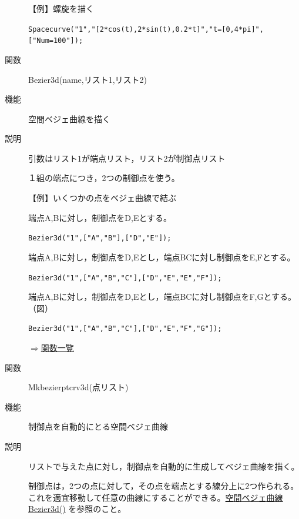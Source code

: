 \documentclass[papersize,a4paper,12pt,uplatex]{jsarticle}
\begin{document}
\begin{description}
\vspace{\baselineskip}
【例】螺旋を描く

\verb|Spacecurve("1","[2*cos(t),2*sin(t),0.2*t]","t=[0,4*pi]",["Num=100"]);|

\vspace{\baselineskip}
 \begin{center}  \end{center}


\hypertarget{bezier3d}{}
\item[関数]Bezier3d(name,リスト1,リスト2)
\item[機能]空間ベジェ曲線を描く
\item[説明]引数はリスト1が端点リスト，リスト2が制御点リスト

１組の端点につき，2つの制御点を使う。

\vspace{\baselineskip}
【例】いくつかの点をベジェ曲線で結ぶ

端点A,Bに対し，制御点をD,Eとする。

\verb|Bezier3d("1",["A","B"],["D","E"]);| \vspace{\baselineskip}

端点A,Bに対し，制御点をD,Eとし，端点BCに対し制御点をE,Fとする。

\verb|Bezier3d("1",["A","B","C"],["D","E","E","F"]);|

 端点A,Bに対し，制御点をD,Eとし，端点BCに対し制御点をF,Gとする。（図）
 
\verb|Bezier3d("1",["A","B","C"],["D","E","F","G"]);|

\begin{center}  \end{center}

\begin{flushright} \hyperlink{functionlist}{$\Rightarrow$関数一覧}\end{flushright}

\vspace{\baselineskip}
\hypertarget{mkbezierptcrv3d}{}
\item[関数]Mkbezierptcrv3d(点リスト)
\item[機能]制御点を自動的にとる空間ベジェ曲線
\item[説明]リストで与えた点に対し，制御点を自動的に生成してベジェ曲線を描く。

制御点は，2つの点に対して，その点を端点とする線分上に2つ作られる。これを適宜移動して任意の曲線にすることができる。\hyperlink{bezier3d}{空間ベジェ曲線 Bezier3d()} を参照のこと。


\end{description}
\end{document}
